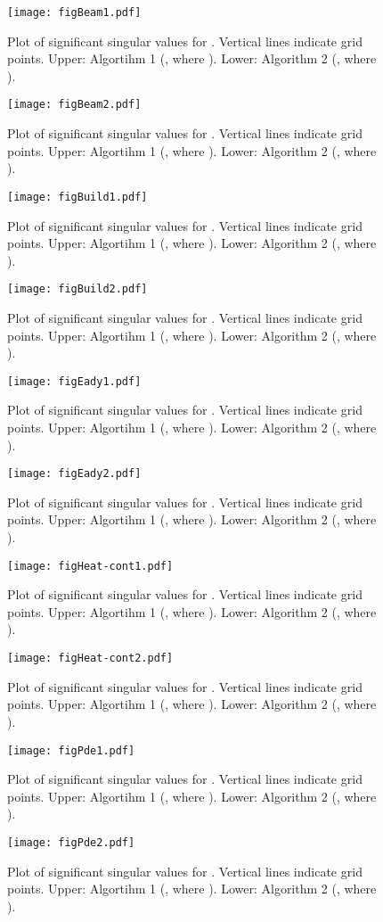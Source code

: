 \documentclass{article}
\begin{document}
\begin{figure}
\centering
\texttt{[image: figBeam1.pdf]}
\caption{Plot of significant singular values  for . Vertical lines indicate grid points. Upper: Algortihm 1 (, where ). Lower: Algorithm 2 (, where ).}
\end{figure}
\begin{figure}
\centering
\texttt{[image: figBeam2.pdf]}
\caption{Plot of significant singular values  for . Vertical lines indicate grid points. Upper: Algortihm 1 (, where ). Lower: Algorithm 2 (, where ).}
\end{figure}
\begin{figure}
\centering
\texttt{[image: figBuild1.pdf]}
\caption{Plot of significant singular values  for . Vertical lines indicate grid points. Upper: Algortihm 1 (, where ). Lower: Algorithm 2 (, where ).}
\end{figure}
\begin{figure}
\centering
\texttt{[image: figBuild2.pdf]}
\caption{Plot of significant singular values  for . Vertical lines indicate grid points. Upper: Algortihm 1 (, where ). Lower: Algorithm 2 (, where ).}
\end{figure}
\begin{figure}
\centering
\texttt{[image: figEady1.pdf]}
\caption{Plot of significant singular values  for . Vertical lines indicate grid points. Upper: Algortihm 1 (, where ). Lower: Algorithm 2 (, where ).}
\end{figure}
\begin{figure}
\centering
\texttt{[image: figEady2.pdf]}
\caption{Plot of significant singular values  for . Vertical lines indicate grid points. Upper: Algortihm 1 (, where ). Lower: Algorithm 2 (, where ).}
\end{figure}
\begin{figure}
\centering
\texttt{[image: figHeat-cont1.pdf]}
\caption{Plot of significant singular values  for . Vertical lines indicate grid points. Upper: Algortihm 1 (, where ). Lower: Algorithm 2 (, where ).}
\end{figure}
\begin{figure}
\centering
\texttt{[image: figHeat-cont2.pdf]}
\caption{Plot of significant singular values  for . Vertical lines indicate grid points. Upper: Algortihm 1 (, where ). Lower: Algorithm 2 (, where ).}
\end{figure}
\begin{figure}
\centering
\texttt{[image: figPde1.pdf]}
\caption{Plot of significant singular values  for . Vertical lines indicate grid points. Upper: Algortihm 1 (, where ). Lower: Algorithm 2 (, where ).}
\end{figure}
\begin{figure}
\centering
\texttt{[image: figPde2.pdf]}
\caption{Plot of significant singular values  for . Vertical lines indicate grid points. Upper: Algortihm 1 (, where ). Lower: Algorithm 2 (, where ).}
\end{figure}
\end{document}
